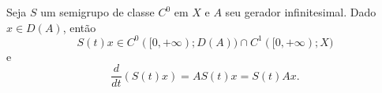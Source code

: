 
\begin{theorem}\label{th-der}
Seja $S$ um semigrupo de classe $C^0$ em $X$ e $A$ seu gerador infinitesimal. Dado $x\in D(A)$, então 
\[S(t)x\in C^0([0,+\infty);D(A))\cap C^1([0,+\infty);X)\]
e
\begin{equation}\label{eq-der}
\frac{d}{dt}\left(S(t)x\right)=AS(t)x=S(t)Ax.
\end{equation}

\end{theorem}
